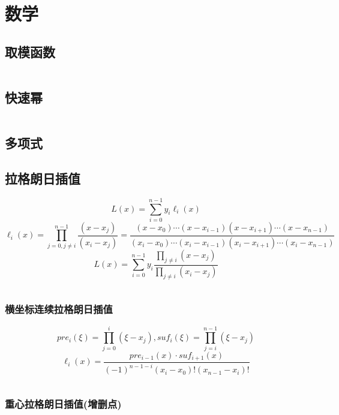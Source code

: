 \documentclass[utf8]{ctexart}
\newcommand{\cpp}[1]{\inputminted[linenos,breaklines,tabsize=4,mathescape]{c++}{#1}}
\begin{document}
\section{数学}

\subsection{取模函数}
\cpp{codes/math/mod.cpp}

\subsection{快速幂}
\cpp{codes/math/power.cpp}


\subsection{多项式}

\subsection{拉格朗日插值}

$$L(x) = \sum_{i=0}^{n-1} y_i \ell_i(x)$$
$$\ell_i(x) = \prod_{j=0,j\ne i}^{n-1} \frac{(x - x_j)}{(x_i - x_j)} = \frac{(x - x_0) \cdots (x - x_{i-1})(x - x_{i+1}) \cdots (x - x_{n-1})}{(x_i - x_0) \cdots (x_i - x_{i-1})(x_i - x_{i+1}) \cdots (x_i - x_{n-1})}$$
$$L(x) = \sum_{i=0}^{n-1} y_i \frac{\prod \limits_{j \ne i} (x - x_j)}{\prod \limits_{j \ne i} (x_i - x_j)}$$

\cpp{codes/math/polynomial/lagrange.cpp}

\subsubsection{横坐标连续拉格朗日插值}

$$pre_i(\xi) = \prod_{j=0}^i (\xi - x_j), suf_i(\xi) = \prod_{j=i}^{n-1} (\xi - x_j)$$
$$\ell_i(x) = \frac{pre_{i-1}(x) \cdot suf_{i+1}(x)}{(-1)^{n-1-i}(x_i - x_0)! (x_{n-1} - x_i)!}$$

\cpp{codes/math/polynomial/lagrange-consecutive.cpp}

\subsubsection{重心拉格朗日插值(增删点)}
\end{document}
